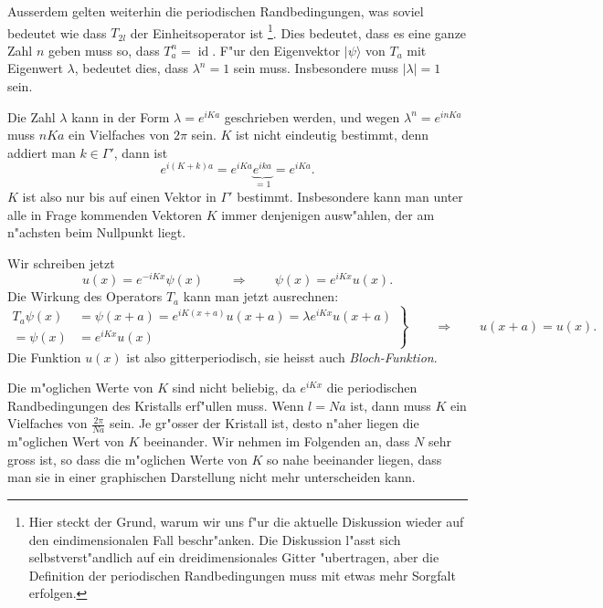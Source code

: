 Ausserdem gelten weiterhin die periodischen Randbedingungen,
was soviel bedeutet wie dass $T_{2l}$ der Einheitsoperator ist%
\footnote{Hier
steckt der Grund, warum wir uns f"ur die aktuelle Diskussion wieder
auf den eindimensionalen Fall beschr"anken. Die Diskussion l"asst sich
selbstverst"andlich auf ein dreidimensionales Gitter "ubertragen, aber
die Definition der periodischen Randbedingungen muss mit etwas mehr
Sorgfalt erfolgen.}.
Dies bedeutet, dass es eine ganze Zahl $n$ geben muss so,
dass $T_a^n=\operatorname{id}$. F"ur den Eigenvektor $|\psi\rangle$
von $T_a$ mit Eigenwert $\lambda$, bedeutet dies, dass $\lambda^n=1$
sein muss. Insbesondere muss $|\lambda|=1$ sein. 

Die Zahl $\lambda$ kann in der Form $\lambda=e^{iKa}$ geschrieben werden,
und wegen $\lambda^n=e^{inKa}$ muss $nKa$ ein Vielfaches von $2\pi$ sein.
$K$ ist nicht eindeutig bestimmt, denn addiert man $k\in\Gamma'$, dann ist
\[
e^{i(K+k)a}=e^{iKa}\underbrace{e^{ika}}_{=1}=e^{iKa}.
\]
$K$ ist also nur bis auf einen Vektor in $\Gamma'$ bestimmt.
Insbesondere kann man unter alle in Frage kommenden Vektoren $K$ immer
denjenigen ausw"ahlen, der am n"achsten beim Nullpunkt liegt.

Wir schreiben jetzt
\[
u(x)=e^{-iKx}\psi(x)
\qquad\Rightarrow\qquad
\psi(x)=e^{iKx}u(x).
\]
Die Wirkung des Operators $T_a$ kann man jetzt ausrechnen:
\begin{equation}
\left.
\begin{aligned}
T_a\psi(x)&=\psi(x+a)=e^{iK(x+a)}u(x+a)=\lambda e^{iKx}u(x+a)
\\
=\psi(x)&=e^{iKx}u(x)
\end{aligned}
\right\}
\qquad\Rightarrow\qquad
u(x+a)=u(x).
\end{equation}
Die Funktion $u(x)$ ist also gitterperiodisch, sie heisst auch
{\em Bloch-Funktion}.
%

Die m"oglichen Werte von $K$ sind nicht beliebig, da $e^{iKx}$ die
periodischen Randbedingungen des Kristalls erf"ullen muss. Wenn $l=Na$
ist, dann muss $K$ ein Vielfaches von $\frac{2\pi}{Na}$ sein.
Je gr"osser der Kristall ist, desto n"aher liegen die m"oglichen
Wert von $K$ beeinander.
Wir nehmen im Folgenden an, dass $N$ sehr gross ist, so dass die
m"oglichen Werte von $K$ so nahe beeinander liegen, dass man sie in
einer graphischen Darstellung nicht mehr unterscheiden kann.


